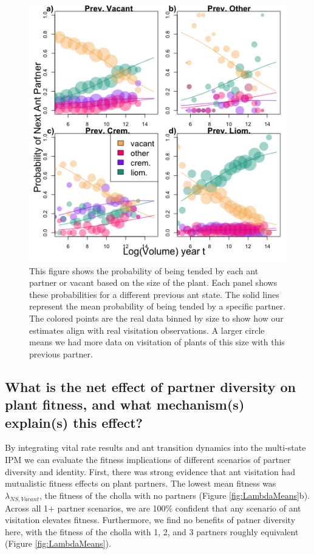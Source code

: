 \documentclass[11pt]{article}
\begin{document}
\begin{figure}[H]
	\includegraphics[width=0.95\linewidth]{Figures/transition.png}
	\caption{This figure shows the probability of being tended by each ant partner or vacant based on the size of the plant. Each panel shows these probabilities for a different previous ant state. The solid lines represent the mean probability of being tended by a specific partner. The colored points are the real data binned by size to show how our estimates align with real visitation observations. A larger circle means we had more data on visitation of plants of this size with this previous partner.}
	\label{fig:Ant_Transition}
\end{figure}

\subsection*{What is the net effect of partner diversity on plant fitness, and what mechanism(s) explain(s) this effect?}
By integrating vital rate results and ant transition dynamics into the multi-state IPM we can evaluate the fitness implications of different scenarios of partner diversity and identity. 
First, there was strong evidence that ant visitation had mutualistic fitness effects on plant partners. 
The lowest mean fitness was $\lambda_{NS,Vacant}$, the fitness of the cholla with no partners (Figure \ref{fig:LambdaMeans}b).
Across all 1+ partner scenarios, we are 100\% confident that any scenario of ant visitation elevates fitness. 
Furthermore, we find no benefits of patner diversity here, with the fitness of the cholla with 1, 2, and 3 partners roughly equivalent (Figure \ref{fig:LambdaMeans}).
\end{document}
